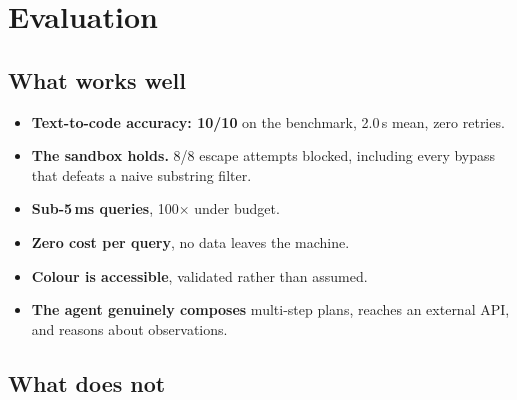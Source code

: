 \documentclass[11pt,a4paper]{article}
\begin{document}
\section{Evaluation}

\subsection*{What works well}

\begin{itemize}[leftmargin=*]
\item \textbf{Text-to-code accuracy: 10/10} on the benchmark, 2.0\,s mean, zero retries.
\item \textbf{The sandbox holds.} 8/8 escape attempts blocked, including every bypass
      that defeats a naive substring filter.
\item \textbf{Sub-5\,ms queries}, 100$\times$ under budget.
\item \textbf{Zero cost per query}, no data leaves the machine.
\item \textbf{Colour is accessible}, validated rather than assumed.
\item \textbf{The agent genuinely composes} multi-step plans, reaches an external API,
      and reasons about observations.
\end{itemize}

\subsection*{What does not}
\end{document}
